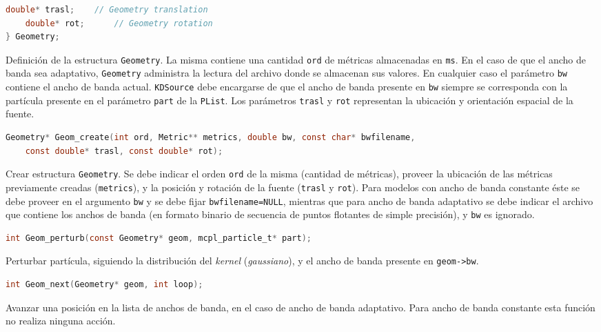 \begin{footnotesize}
\begin{lstlisting}[language=C]
	double* trasl;    // Geometry translation
	double* rot;      // Geometry rotation
} Geometry;
\end{lstlisting}
\begin{addmargin}[0.5cm]{0cm}
Definición de la estructura \verb|Geometry|. La misma contiene una cantidad \verb|ord| de métricas almacenadas en \verb|ms|. En el caso de que el ancho de banda sea adaptativo, \verb|Geometry| administra la lectura del archivo donde se almacenan sus valores. En cualquier caso el parámetro \verb|bw| contiene el ancho de banda actual. \verb|KDSource| debe encargarse de que el ancho de banda presente en \verb|bw| siempre se corresponda con la partícula presente en el parámetro \verb|part| de la \verb|PList|. Los parámetros \verb|trasl| y \verb|rot| representan la ubicación y orientación espacial de la fuente.
\end{addmargin}

\begin{lstlisting}[language=C]
Geometry* Geom_create(int ord, Metric** metrics, double bw, const char* bwfilename,
	const double* trasl, const double* rot);
\end{lstlisting}
\begin{addmargin}[0.5cm]{0cm}
Crear estructura \verb|Geometry|. Se debe indicar el orden \verb|ord| de la misma (cantidad de métricas), proveer la ubicación de las métricas previamente creadas (\verb|metrics|), y la posición y rotación de la fuente (\verb|trasl| y \verb|rot|). Para modelos con ancho de banda constante éste se debe proveer en el argumento \verb|bw| y se debe fijar \verb|bwfilename=NULL|, mientras que para ancho de banda adaptativo se debe indicar el archivo que contiene los anchos de banda (en formato binario de secuencia de puntos flotantes de simple precisión), y \verb|bw| es ignorado.
\end{addmargin}

\begin{lstlisting}[language=C]
int Geom_perturb(const Geometry* geom, mcpl_particle_t* part);
\end{lstlisting}
\begin{addmargin}[0.5cm]{0cm}
Perturbar partícula, siguiendo la distribución del \emph{kernel} (\emph{gaussiano}), y el ancho de banda presente en \verb|geom->bw|.
\end{addmargin}

\begin{lstlisting}[language=C]
int Geom_next(Geometry* geom, int loop);
\end{lstlisting}
\begin{addmargin}[0.5cm]{0cm}
Avanzar una posición en la lista de anchos de banda, en el caso de ancho de banda adaptativo. Para ancho de banda constante esta función no realiza ninguna acción.
\end{addmargin}


\end{footnotesize}
